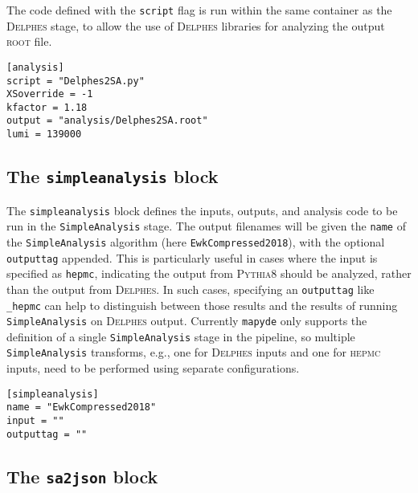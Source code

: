 \documentclass{article}
\newcommand{\mapyde}{\texttt{mapyde}}
\newcommand{\simpleanalysis}{\texttt{SimpleAnalysis}}
\newcommand{\pythia}{\textsc{Pythia8}}
\newcommand{\delphes}{\textsc{Delphes}}
\newcommand{\hepmc}{\textsc{hepmc}}
\newcommand{\ROOT}{\textsc{root}}
\newcommand{\toml}{\textsc{toml}}
\begin{document}
The code defined with the \texttt{script} flag is run within the same container as the \delphes{} stage, to allow the use of \delphes{} libraries for analyzing the output \ROOT{} file.

\begin{listing}[H]
	\begin{verbatim}
[analysis]
script = "Delphes2SA.py"
XSoverride = -1
kfactor = 1.18
output = "analysis/Delphes2SA.root"
lumi = 139000
        \end{verbatim}
	\caption{The \texttt{analysis} block of an example \toml{} configuration file for generating slepton events.}
	\label{slepton-config-analysis}
\end{listing}

\subsection{The \texttt{simpleanalysis} block}
\label{ssec:the-simpleanalysis-block}

The \texttt{simpleanalysis} block defines the inputs, outputs, and analysis code to be run in the \simpleanalysis{} stage.  The output filenames will be given the \texttt{name} of the \simpleanalysis{} algorithm (here \texttt{EwkCompressed2018}), with the optional \texttt{outputtag} appended.  This is particularly useful in cases where the input is specified as \texttt{hepmc}, indicating the output from \pythia{} should be analyzed, rather than the output from \delphes.  In such cases, specifying an \texttt{outputtag} like \texttt{\_hepmc} can help to distinguish between those results and the results of running \simpleanalysis{} on \delphes{} output.  Currently \mapyde{} only supports the definition of a single \simpleanalysis{} stage in the pipeline, so multiple \simpleanalysis{} transforms, e.g., one for \delphes{} inputs and one for \hepmc{} inputs, need to be performed using separate configurations.

\begin{listing}[H]
	\begin{verbatim}
[simpleanalysis]
name = "EwkCompressed2018"
input = ""
outputtag = ""
        \end{verbatim}
	\caption{The \texttt{simpleanalysis} block of an example \toml{} configuration file for generating slepton events.}
	\label{slepton-config-sa}
\end{listing}

\subsection{The \texttt{sa2json} block}
\label{ssec:the-sa2json-block}
\end{document}
